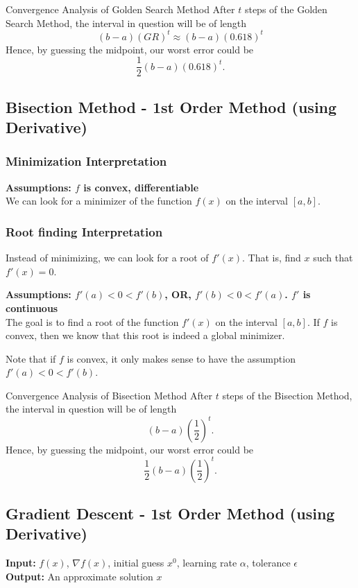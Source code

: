 \documentclass[../open-optimization/open-optimization.tex]{subfiles}
\begin{document}
\begin{general}{Convergence Analysis of Golden Search Method}{}
After $t$ steps of the Golden Search Method, the interval in question will be of length
$$
(b-a)(GR)^t \approx (b-a)(0.618)^t
$$
Hence, by guessing the midpoint, our worst error could be
$$
\frac{1}{2}(b-a)(0.618)^t.
$$
\end{general}






\subsection{Bisection Method - 1st Order Method (using Derivative)}

\subsubsection{Minimization Interpretation}
\textbf{Assumptions: $f$ is convex, differentiable}\\

We can look for a minimizer of the function $f(x)$ on the interval $[a,b]$.


\subsubsection{Root finding Interpretation}
Instead of minimizing, we can look for a root of $f'(x)$.  That is, find $x$ such that $f'(x) = 0$.  

\textbf{Assumptions: $f'(a)<0 <  f'(b)$, OR, $f'(b) < 0 < f'(a)$.  $f'$ is continuous}\\
The goal is to find a root of the function $f'(x)$ on the interval $[a,b]$.  If $f$ is convex, then we know that this root is indeed a global minimizer.


Note that if $f$ is convex, it only makes sense to have the assumption $f'(a)<0 <  f'(b)$.






\begin{general}{Convergence Analysis of Bisection Method}{}
After $t$ steps of the Bisection Method, the interval in question will be of length
$$
(b-a)\left(\frac{1}{2}\right)^t.
$$
Hence, by guessing the midpoint, our worst error could be
$$
\frac{1}{2}(b-a)\left(\frac{1}{2}\right)^t.
$$
\end{general}

\subsection{Gradient Descent - 1st Order Method (using Derivative)}
\textbf{Input:} $f(x)$, $\nabla f(x)$, initial guess $x^0$, learning rate $\alpha$, tolerance $\epsilon$\\
\textbf{Output:} An approximate solution $x$
\end{document}
